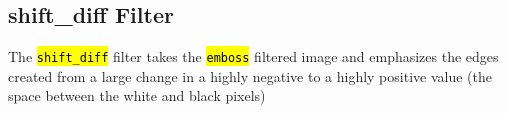 \documentclass[10pt]{scrartcl}
\begin{document}

    \subsection{shift\_diff Filter}
    \label{sub:shift_diff_filter}
    The \hl{\texttt{shift\_diff}} filter takes the \hl{\texttt{emboss}} filtered image and emphasizes the edges created from a large change in a highly negative to a highly positive value (the space between the white and black pixels)
\end{document}
